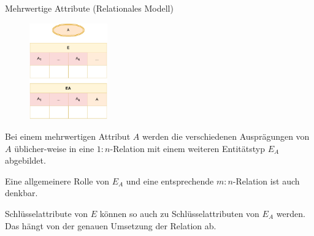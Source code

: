 \begin{defi}{Mehrwertige Attribute (Relationales Modell)}
    \begin{figure}
        \begin{center}
            \includegraphics[width=0.3\textwidth]{includes/figures/definition_relational_modell_attribute_multiple.pdf}
        \end{center}
    \end{figure}
    Bei einem mehrwertigen Attribut $A$ werden die verschiedenen Ausprägungen von $A$ üblicher-weise in eine $1:n$-Relation mit einem weiteren Entitätstyp $E_A$ abgebildet.

    Eine allgemeinere Rolle von $E_A$ und eine entsprechende $m:n$-Relation ist auch denkbar.

    Schlüsselattribute von $E$ können so auch zu Schlüsselattributen von $E_A$ werden.
    Das hängt von der genauen Umsetzung der Relation ab.

    \vspace{6em}
\end{defi}

